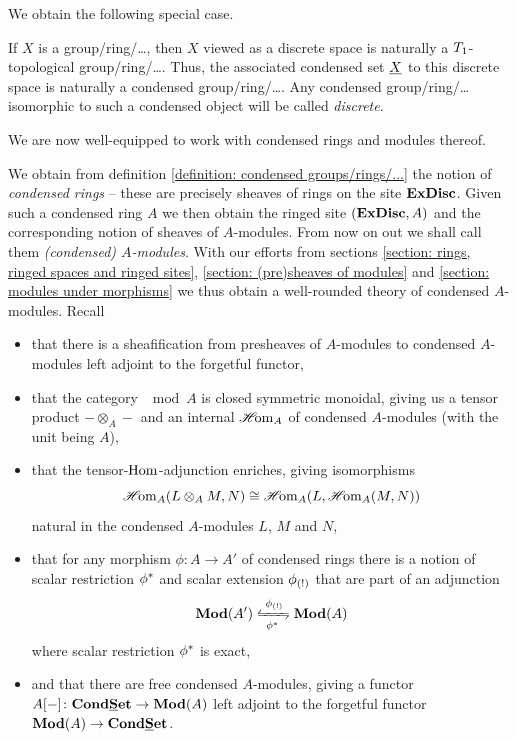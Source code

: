 We obtain the following special case.
\begin{definition}
	If $X$ is a group/ring/\dots, then $X$ viewed as a discrete space is naturally a ${T_1}$-topological group/ring/\dots. Thus, the associated condensed set $\underline{X}$ to this discrete space is naturally a condensed group/ring/\dots. Any condensed group/ring/\dots isomorphic to such a condensed object will be called \emph{discrete}.
\end{definition}

We are now well-equipped to work with condensed rings and modules thereof.
\begin{remark}
	We obtain from definition \ref{definition: condensed groups/rings/...} the notion of \emph{condensed rings} -- these are precisely sheaves of rings on the site ${\mathbf{ExDisc}}$. Given such a condensed ring $A$ we then obtain the ringed site $({\mathbf{ExDisc}}, A)$ and the corresponding notion of sheaves of $A$-modules. From now on out we shall call them \emph{(condensed) $A$-modules}. With our efforts from sections \ref{section: rings, ringed spaces and ringed sites}, \ref{section: (pre)sheaves of modules} and \ref{section: modules under morphisms} we thus obtain a well-rounded theory of condensed $A$-modules. Recall 
	\begin{itemize}
		\item
		that there is a sheafification from presheaves of $A$-modules to condensed $A$-modules left adjoint to the forgetful functor,
		
		\item
		that the category $\mod{A}$ is closed symmetric monoidal, giving us a tensor product $-\otimes_A -$ and an internal ${\operatorname{\mathscr{H}\!om}}_A$ of condensed $A$-modules (with the unit being $A$),
		
		\item 
		that the tensor-${\operatorname{Hom}}$-adjunction enriches, giving isomorphisms
			$${\operatorname{\mathscr{H}\!om}}_A(L \otimes_A M, N) \cong {\operatorname{\mathscr{H}\!om}}_A(L, {\operatorname{\mathscr{H}\!om}}_A(M, N))$$
		natural in the condensed $A$-modules $L$, $M$ and $N$,
		
		\item
		that for any morphism $\phi\colon A\to A'$ of condensed rings there is a notion of scalar restriction ${\phi^\ast}$ and scalar extension ${\phi_{(!)}}$ that are part of an adjunction
			$$\mod{A'}\xleftrightarrows{\scalarExtension{\phi}}{\scalarRestriction{\phi}}\mod{A}$$
		where scalar restriction ${\phi^\ast}$ is exact,
		
		\item
		and that there are free condensed $A$-modules, giving a functor ${A[-]}\colon {{{\mathbf{Cond}}}{{\mathbf{\underline{S}et}}}} \to {{\mathbf{Mod}}(A)}$ left adjoint to the forgetful functor ${{\mathbf{Mod}}(A)}\to{{{\mathbf{Cond}}}{{\mathbf{\underline{S}et}}}}$.
	\end{itemize}
\end{remark}

